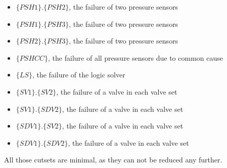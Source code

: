 \begin{itemize}
\item \colorbox{blue!30}{$\{PSH1\}$}.\colorbox{blue!30}{$\{PSH2\}$}, the failure of two pressure sensors
\item \colorbox{blue!30}{$\{PSH1\}$}.\colorbox{blue!30}{$\{PSH3\}$}, the failure of two pressure sensors
\item \colorbox{blue!30}{$\{PSH2\}$}.\colorbox{blue!30}{$\{PSH3\}$}, the failure of two pressure sensors
\item \colorbox{blue!30}{$\{PSHCC\}$}, the failure of all pressure sensors due to common cause
\item \colorbox{green!30}{$\{LS\}$}, the failure of the logic solver
\item \colorbox{red!30}{$\{SV1\}$}.\colorbox{red!30}{$\{SV2\}$}, the failure of a valve in each valve set
\item \colorbox{red!30}{$\{SV1\}$}.\colorbox{red!30}{$\{SDV2\}$}, the failure of a valve in each valve set
\item \colorbox{red!30}{$\{SDV1\}$}.\colorbox{red!30}{$\{SV2\}$}, the failure of a valve in each valve set
\item \colorbox{red!30}{$\{SDV1\}$}.\colorbox{red!30}{$\{SDV2\}$}, the failure of a valve in each valve set
\end{itemize}

All those cutsets are minimal, as they can not be reduced any further.

